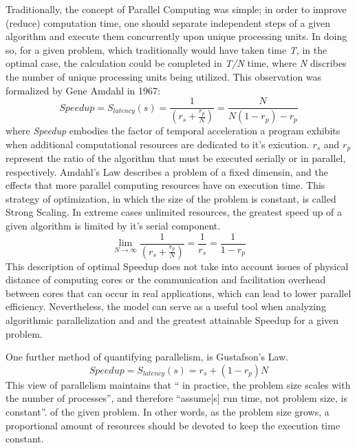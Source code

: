 Traditionally, the concept of Parallel Computing was simple; in order to improve
(reduce) computation time, one should separate independent steps of a given algorithm
and execute them concurrently upon unique processing units.  In doing so, for a given
problem, which traditionally would have taken time \textit{T}, in the optimal case,
the calculation could be completed in \textit{T/N} time, where \textit{N} discribes
the number of unique processing units being utilized.  This observation was formalized
by Gene Amdahl in 1967\cite{Wilt}:
%
\begin{equation}
  \tag{Amdahl's Law}
  Speedup = S_{latency}(s)= \frac{1}{(r_{s} + \frac{r_{p}}{N})} = \frac{N}{N(1-r_{p})-r_{p}}
  \label{egn:Amdahl}
\end{equation}
%
where \textit{Speedup} embodies the factor of temporal acceleration a program
exhibits when additional computational resources are dedicated to it's exicution.
 \textit{$r_{s}$} and \textit{$ r_{p} $} represent the ratio of the algorithm that must be executed serially or in parallel, respectively.  Amdahl's Law describes a problem of a fixed dimensin,
and the effects that more parallel computing resources have on execution time.
This strategy of optimization, in which the size of the problem is constant,
 is called Strong Scaling.
In extreme cases unlimited resources, the greatest speed up of a given algorithm
 is limited by it's serial component.
%
\begin{equation}
 \lim_{N\to\infty}  \frac{1}{(r_{s} + \frac{r_{p}}{N})} = \frac{1}{r_{s}} = \frac{1}{1-r_{p}}
\end{equation}
%
This description of optimal Speedup does not take into account issues of physical
distance of computing cores or the communication and facilitation overhead between
cores that can occur in real applications, which can lead to lower parallel efficiency.
Nevertheless, the model can serve as a useful tool when analyzing algorithmic parallelization and and the greatest
attainable Speedup for a given problem.\par

One further method of quantifying parallelism, is Gustafson's Law\cite{Gustafson}.
%
\begin{equation}
  \tag{Gustofson's Law}
  Speedup = S_{latency}(s) = r_{s} + (1 - r_{p})N
\end{equation}
%
This view of parallelism maintains that `` in practice, the problem
size scales with the number of processes'', and therefore
``assume[s] run time, not problem size, is constant''.
of the given problem. In other words, as the problem size grows, a proportional
amount of resources should be devoted to keep the execution time constant.

